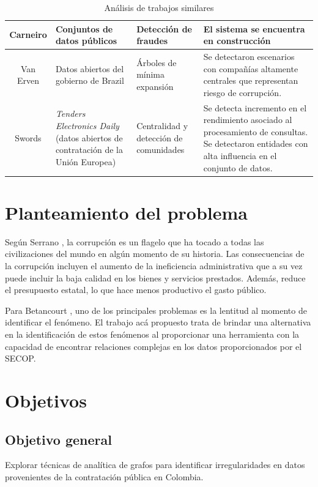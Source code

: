 \documentclass[11pt,letterpaper,oneside]{article}
\begin{document}
\begin{table}[!b]
\begin{center}
\begin{tabular}{ |c|p{3cm}|p{3cm}|p{5cm}| }
			Carneiro & Conjuntos de datos públicos & Detección de fraudes & El sistema se encuentra en construcción \\ \hline
			
			Van Erven & Datos abiertos del gobierno de Brazil & Árboles de mínima expansión & Se detectaron escenarios con compañías altamente centrales que representan riesgo de corrupción. \\ \hline
			
			Swords & \textit{Tenders Electronics Daily} (datos abiertos de contratación de la Unión Europea) & Centralidad y detección de comunidades & Se detecta incremento en el rendimiento asociado al procesamiento de consultas. Se detectaron entidades con alta influencia en el conjunto de datos. \\ \hline
			
			
		\end{tabular}
	\end{center}		
		\caption{Análisis de trabajos similares}
		\label{tab:t07}
	\end{table}


	\section{Planteamiento del problema}
	
	Según Serrano \cite{Serrano-2014}, la corrupción es un flagelo que ha tocado a todas las civilizaciones del mundo en algún momento de su historia. Las consecuencias de la corrupción incluyen el aumento de la ineficiencia administrativa que a su vez puede incluir la baja calidad en los bienes y servicios prestados. Además, reduce el presupuesto estatal, lo que hace menos productivo el gasto público.
	
	Para Betancourt \cite{Betancourt-2018}, uno de los principales problemas es la lentitud al momento de identificar el fenómeno. El trabajo acá propuesto trata de brindar una alternativa en la identificación de estos fenómenos al proporcionar una herramienta con la capacidad de encontrar relaciones complejas en los datos proporcionados por el SECOP.
	
	
	\section{Objetivos}
		\subsection{Objetivo general}
		Explorar técnicas de analítica de grafos para identificar irregularidades en datos provenientes de la contratación pública en Colombia.	
\end{document}
